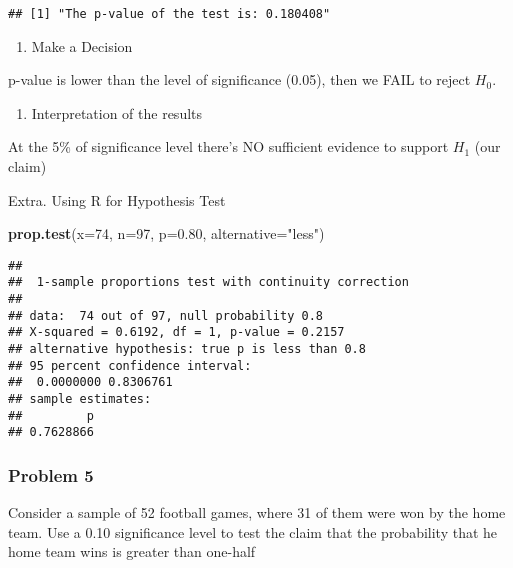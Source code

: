 \documentclass[
]{article}
\newenvironment{Shaded}{\begin{snugshade}}{\end{snugshade}}
\newcommand{\AttributeTok}[1]{\textcolor[rgb]{0.13,0.29,0.53}{#1}}
\newcommand{\DecValTok}[1]{\textcolor[rgb]{0.00,0.00,0.81}{#1}}
\newcommand{\FloatTok}[1]{\textcolor[rgb]{0.00,0.00,0.81}{#1}}
\newcommand{\FunctionTok}[1]{\textcolor[rgb]{0.13,0.29,0.53}{\textbf{#1}}}
\newcommand{\NormalTok}[1]{#1}
\newcommand{\StringTok}[1]{\textcolor[rgb]{0.31,0.60,0.02}{#1}}
\providecommand{\tightlist}{%
  \setlength{\itemsep}{0pt}\setlength{\parskip}{0pt}}
\begin{document}
\begin{verbatim}
## [1] "The p-value of the test is: 0.180408"
\end{verbatim}

\begin{enumerate}
\def\labelenumi{\arabic{enumi}.}
\setcounter{enumi}{3}
\tightlist
\item
  Make a Decision
\end{enumerate}

p-value is lower than the level of significance (0.05), then we FAIL to
reject \(H_{0}\).

\begin{enumerate}
\def\labelenumi{\arabic{enumi}.}
\setcounter{enumi}{4}
\tightlist
\item
  Interpretation of the results
\end{enumerate}

At the 5\% of significance level there's NO sufficient evidence to
support \(H_{1}\) (our claim)

Extra. Using R for Hypothesis Test

\begin{Shaded}
\begin{Highlighting}[]
\FunctionTok{prop.test}\NormalTok{(}\AttributeTok{x=}\DecValTok{74}\NormalTok{, }\AttributeTok{n=}\DecValTok{97}\NormalTok{, }\AttributeTok{p=}\FloatTok{0.80}\NormalTok{, }\AttributeTok{alternative=}\StringTok{"less"}\NormalTok{)}
\end{Highlighting}
\end{Shaded}

\begin{verbatim}
## 
##  1-sample proportions test with continuity correction
## 
## data:  74 out of 97, null probability 0.8
## X-squared = 0.6192, df = 1, p-value = 0.2157
## alternative hypothesis: true p is less than 0.8
## 95 percent confidence interval:
##  0.0000000 0.8306761
## sample estimates:
##         p 
## 0.7628866
\end{verbatim}

\hypertarget{problem-5}{%
\subsubsection{Problem 5}\label{problem-5}}

Consider a sample of 52 football games, where 31 of them were won by the
home team. Use a 0.10 significance level to test the claim that the
probability that he home team wins is greater than one-half
\end{document}
